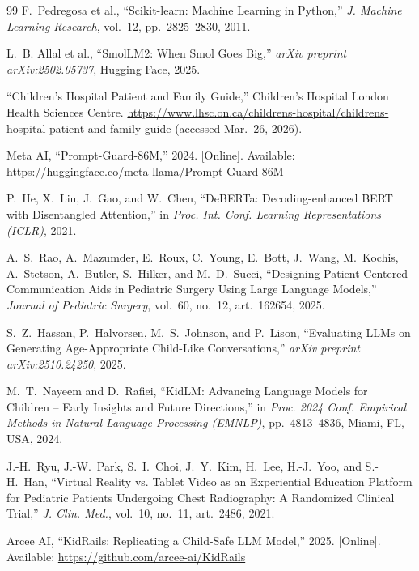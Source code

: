 \documentclass[pdflatex,sn-mathphys-num]{sn-jnl}%
\begin{document}
\begin{thebibliography}{99}
F.~Pedregosa et al., ``Scikit-learn: Machine Learning in Python,'' \textit{J. Machine Learning Research}, vol.~12, pp.~2825--2830, 2011.

L.~B. Allal et al., ``SmolLM2: When Smol Goes Big,'' \textit{arXiv preprint arXiv:2502.05737}, Hugging Face, 2025.

``Children's Hospital Patient and Family Guide,'' Children's Hospital London Health Sciences Centre. \url{https://www.lhsc.on.ca/childrens-hospital/childrens-hospital-patient-and-family-guide} (accessed Mar.\ 26, 2026).

Meta AI, ``Prompt-Guard-86M,'' 2024. [Online]. Available: \url{https://huggingface.co/meta-llama/Prompt-Guard-86M}

P.~He, X.~Liu, J.~Gao, and W.~Chen, ``DeBERTa: Decoding-enhanced BERT with Disentangled Attention,'' in \textit{Proc. Int. Conf. Learning Representations (ICLR)}, 2021.

A.~S.~Rao, A.~Mazumder, E.~Roux, C.~Young, E.~Bott, J.~Wang, M.~Kochis, A.~Stetson, A.~Butler, S.~Hilker, and M.~D.~Succi, ``Designing Patient-Centered Communication Aids in Pediatric Surgery Using Large Language Models,'' \textit{Journal of Pediatric Surgery}, vol.~60, no.~12, art.~162654, 2025.

S.~Z.~Hassan, P.~Halvorsen, M.~S.~Johnson, and P.~Lison, ``Evaluating LLMs on Generating Age-Appropriate Child-Like Conversations,'' \textit{arXiv preprint arXiv:2510.24250}, 2025.

M.~T.~Nayeem and D.~Rafiei, ``KidLM: Advancing Language Models for Children -- Early Insights and Future Directions,'' in \textit{Proc. 2024 Conf. Empirical Methods in Natural Language Processing (EMNLP)}, pp.~4813--4836, Miami, FL, USA, 2024.

J.-H.~Ryu, J.-W.~Park, S.~I.~Choi, J.~Y.~Kim, H.~Lee, H.-J.~Yoo, and S.-H.~Han, ``Virtual Reality vs. Tablet Video as an Experiential Education Platform for Pediatric Patients Undergoing Chest Radiography: A Randomized Clinical Trial,'' \textit{J. Clin. Med.}, vol.~10, no.~11, art.~2486, 2021.

Arcee AI, ``KidRails: Replicating a Child-Safe LLM Model,'' 2025. [Online]. Available: \url{https://github.com/arcee-ai/KidRails}

\end{thebibliography}
\end{document}

